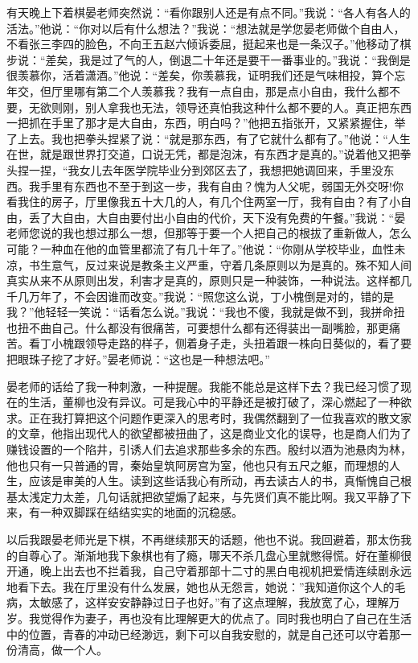 \documentclass[12pt,oneside]{book}
\begin{document}
有天晚上下着棋晏老师突然说：``看你跟别人还是有点不同。''我说：``各人有各人的活法。''他说：``你对以后有什么想法？''我说：``想法就是学您晏老师做个自由人，不看张三李四的脸色，不向王五赵六倾诉委屈，挺起来也是一条汉子。''他移动了棋步说：``差矣，我是过了气的人，倒退二十年还是要干一番事业的。''我说：``我倒是很羡慕你，活着潇酒。''他说：``差矣，你羡慕我，证明我们还是气味相投，算个忘年交，但厅里哪有第二个人羡慕我？我有一点自由，那是点小自由，我什么都不要，无欲则刚，别人拿我也无法，领导还真怕我这种什么都不要的人。真正把东西一把抓在手里了那才是大自由，东西，明白吗？''他把五指张开，又紧紧握住，举了上去。我也把拳头捏紧了说：``就是那东西，有了它就什么都有了。''他说：``人生在世，就是跟世界打交道，口说无凭，都是泡沫，有东西才是真的。''说着他又把拳头捏一捏，``我女儿去年医学院毕业分到郊区去了，我想把她调回来，手里没东西。我手里有东西也不至于到这一步，我有自由？愧为人父呢，弱国无外交呀!你看我住的房子，厅里像我五十大几的人，有几个住两室一厅，我有自由？有了小自由，丢了大自由，大自由要付出小自由的代价，天下没有免费的午餐。''我说：``晏老师您说的我也想过那么一想，但那等于要一个人把自己的根拔了重新做人，怎么可能？一种血在他的血管里都流了有几十年了。''他说：``你刚从学校毕业，血性未凉，书生意气，反过来说是教条主义严重，守着几条原则以为是真的。殊不知人间真实从来不从原则出发，利害才是真的，原则只是一种装饰，一种说法。这样都几千几万年了，不会因谁而改变。''我说：``照您这么说，丁小槐倒是对的，错的是我？''他轻轻一笑说：``话看怎么说。''我说：``我也不傻，我就是做不到，我拼命扭也扭不曲自己。什么都没有很痛苦，可要想什么都有还得装出一副嘴脸，那更痛苦。看丁小槐跟领导走路的样子，侧着身子走，头扭着跟一株向日葵似的，看了要把眼珠子挖了才好。''晏老师说：``这也是一种想法吧。''

晏老师的话给了我一种刺激，一种提醒。我能不能总是这样下去？我已经习惯了现在的生活，董柳也没有异议。可是我心中的平静还是被打破了，深心燃起了一种欲求。正在我打算把这个问题作更深入的思考时，我偶然翻到了一位我喜欢的散文家的文章，他指出现代人的欲望都被扭曲了，这是商业文化的误导，也是商人们为了赚钱设置的一个陷井，引诱人们去追求那些多余的东西。殷纣以酒为池悬肉为林，他也只有一只普通的胃，秦始皇筑阿房宫为室，他也只有五尺之躯，而理想的人生，应该是审美的人生。读到这些话我心有所动，再去读古人的书，真惭愧自己根基太浅定力太差，几句话就把欲望煽了起来，与先贤们真不能比啊。我又平静了下来，有一种双脚踩在结结实实的地面的沉稳感。

以后我跟晏老师光是下棋，不再继续那天的话题，他也不说。我回避着，那太伤我的自尊心了。渐渐地我下象棋也有了瘾，哪天不杀几盘心里就憋得慌。好在董柳很开通，晚上出去也不拦着我，自己守着那部十二寸的黑白电视机把爱情连续剧永远地看下去。我在厅里没有什么发展，她也从无怨言，她说：''我知道你这个人的毛病，太敏感了，这样安安静静过日子也好。''有了这点理解，我放宽了心，理解万岁。我觉得作为妻子，再也没有比理解更大的优点了。同时我也明白了自己在生活中的位置，青春的冲动已经渺远，剩下可以自我安慰的，就是自己还可以守着那一份清高，做一个人。
\end{document}
